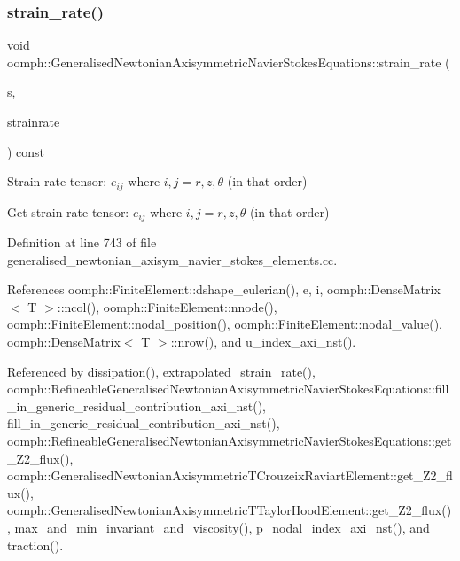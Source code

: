 \mbox{\label{classoomph_1_1GeneralisedNewtonianAxisymmetricNavierStokesEquations_af8f4209f5073bcd5cb50901711fbbdbc}} 
\subsubsection{\texorpdfstring{strain\+\_\+rate()}{strain\_rate()}\hspace{0.1cm}{\footnotesize\ttfamily [1/2]}}
{\footnotesize\ttfamily void oomph\+::\+Generalised\+Newtonian\+Axisymmetric\+Navier\+Stokes\+Equations\+::strain\+\_\+rate (\begin{DoxyParamCaption}\item[{const \hyperlink{classoomph_1_1Vector}{Vector}$<$ double $>$ \&}]{s,  }\item[{\hyperlink{classoomph_1_1DenseMatrix}{Dense\+Matrix}$<$ double $>$ \&}]{strainrate }\end{DoxyParamCaption}) const}



Strain-\/rate tensor\+: $ e_{ij} $ where $ i,j = r,z,\theta $ (in that order) 

Get strain-\/rate tensor\+: $ e_{ij} $ where $ i,j = r,z,\theta $ (in that order) 

Definition at line 743 of file generalised\+\_\+newtonian\+\_\+axisym\+\_\+navier\+\_\+stokes\+\_\+elements.\+cc.



References oomph\+::\+Finite\+Element\+::dshape\+\_\+eulerian(), e, i, oomph\+::\+Dense\+Matrix$<$ T $>$\+::ncol(), oomph\+::\+Finite\+Element\+::nnode(), oomph\+::\+Finite\+Element\+::nodal\+\_\+position(), oomph\+::\+Finite\+Element\+::nodal\+\_\+value(), oomph\+::\+Dense\+Matrix$<$ T $>$\+::nrow(), and u\+\_\+index\+\_\+axi\+\_\+nst().



Referenced by dissipation(), extrapolated\+\_\+strain\+\_\+rate(), oomph\+::\+Refineable\+Generalised\+Newtonian\+Axisymmetric\+Navier\+Stokes\+Equations\+::fill\+\_\+in\+\_\+generic\+\_\+residual\+\_\+contribution\+\_\+axi\+\_\+nst(), fill\+\_\+in\+\_\+generic\+\_\+residual\+\_\+contribution\+\_\+axi\+\_\+nst(), oomph\+::\+Refineable\+Generalised\+Newtonian\+Axisymmetric\+Navier\+Stokes\+Equations\+::get\+\_\+\+Z2\+\_\+flux(), oomph\+::\+Generalised\+Newtonian\+Axisymmetric\+T\+Crouzeix\+Raviart\+Element\+::get\+\_\+\+Z2\+\_\+flux(), oomph\+::\+Generalised\+Newtonian\+Axisymmetric\+T\+Taylor\+Hood\+Element\+::get\+\_\+\+Z2\+\_\+flux(), max\+\_\+and\+\_\+min\+\_\+invariant\+\_\+and\+\_\+viscosity(), p\+\_\+nodal\+\_\+index\+\_\+axi\+\_\+nst(), and traction().

